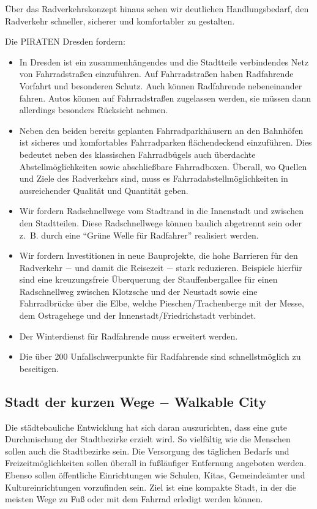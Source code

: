 \documentclass[a4paper, 11pt]{article}
\begin{document}
Über das Radverkehrskonzept hinaus sehen wir deutlichen Handlungsbedarf, den Radverkehr schneller, sicherer und komfortabler zu gestalten.

Die PIRATEN Dresden fordern:
\begin{itemize}
    \item In Dresden ist ein zusammenhängendes und die Stadtteile verbindendes Netz von Fahrradstraßen einzuführen. Auf Fahrradstraßen haben Radfahrende Vorfahrt und besonderen Schutz. Auch können Radfahrende nebeneinander fahren. Autos können auf Fahrradstraßen zugelassen werden, sie müssen dann allerdings besonders Rücksicht nehmen.

    \item  Neben den beiden bereits geplanten Fahrradparkhäusern an den Bahnhöfen ist sicheres und komfortables Fahrradparken flächendeckend einzuführen. Dies bedeutet neben des klassischen Fahrradbügels auch überdachte Abstellmöglichkeiten sowie abschließbare Fahrradboxen. Überall, wo Quellen und Ziele des Radverkehrs sind, muss es Fahrradabstellmöglichkeiten in ausreichender Qualität und Quantität geben.

    \item  Wir fordern Radschnellwege vom Stadtrand in die Innenstadt und zwischen den Stadtteilen. Diese Radschnellwege können baulich abgetrennt sein oder z. B. durch eine ``Grüne Welle für Radfahrer'' realisiert werden.

    \item  Wir fordern Investitionen in neue Bauprojekte, die hohe Barrieren für den Radverkehr $-$ und damit die Reisezeit $-$ stark reduzieren. Beispiele hierfür sind eine kreuzungsfreie Überquerung der Stauffenbergallee für einen Radschnellweg zwischen Klotzsche und der Neustadt sowie eine Fahrradbrücke über die Elbe, welche Pieschen/Trachenberge mit der Messe, dem Ostragehege und der Innenstadt/Friedrichstadt verbindet.

    \item  Der Winterdienst für Radfahrende muss erweitert werden.

    \item Die über 200 Unfallschwerpunkte für Radfahrende sind schnellstmöglich zu beseitigen.
\end{itemize}


\subsection{Stadt der kurzen Wege $-$ Walkable City}
Die städtebauliche Entwicklung hat sich daran auszurichten, dass eine gute Durchmischung der Stadtbezirke erzielt wird. So vielfältig wie die Menschen sollen auch die Stadtbezirke sein. Die Versorgung des täglichen Bedarfs und Freizeitmöglichkeiten sollen überall in fußläufiger Entfernung angeboten werden. Ebenso sollen öffentliche Einrichtungen wie Schulen, Kitas, Gemeindeämter und Kultureinrichtungen vorzufinden sein. Ziel ist eine kompakte Stadt, in der die meisten Wege zu Fuß oder mit dem Fahrrad erledigt werden können.\newline
\end{document}
